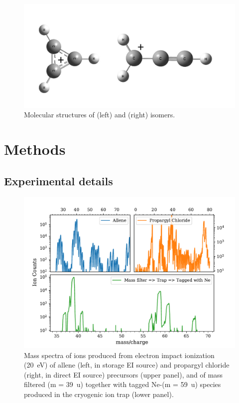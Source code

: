 \begin{figure}
	\centering
		\includegraphics[scale=.4]{chapters/C3H3+ and C3D3+/figures/molecule.pdf}
		\caption{Molecular structures of \cyc (left) and \lin (right) isomers.}
	\label{FIG:C3H3+:molecule}
\end{figure}

\section{Methods}

\subsection{Experimental details}
\vspace{0.5cm}

\begin{figure}

	\centering
		\includegraphics[scale=.7]{chapters/C3H3+ and C3D3+/figures/masspec.pdf}
		
	\caption{Mass spectra of ions produced from electron impact ionization (20~eV) of allene (left, in storage EI source) and propargyl chloride (right, in direct EI source) precursors (upper panel), and of mass filtered \iso (m = 39~u) together with tagged Ne-\iso (m = 59~u) species produced in the cryogenic ion trap (lower panel).}
	
	\label{FIG:C3H3+:masspec}
\end{figure}

